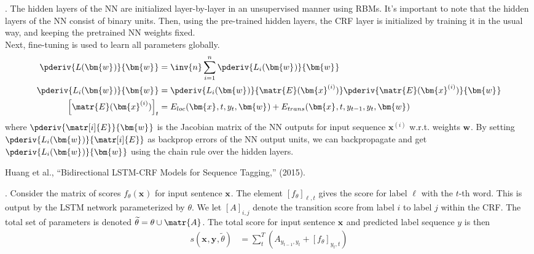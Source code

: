 \documentclass[11pt]{article}
\renewcommand\vec[2][]{\bm{#2}_{#1}}
\newcommand\myspace[1][]{\vspace{#1\bigskipamount}}
\newcommand\p{\Needspace{10\baselineskip} \noindent}
\begin{document}
\myspace
\p {}. The hidden layers of the NN are initialized layer-by-layer in an unsupervised manner using RBMs. It's important to note that the hidden layers of the NN consist of binary units. Then, using the pre-trained hidden layers, the CRF layer is initialized by training it in the usual way, and keeping the pretrained NN weights fixed. \\

Next, fine-tuning is used to learn all parameters globally.
\begin{align}
	\pderiv{L(\vec w)}{\vec w} 
		&= \inv{n}\sum_{i=1}^n \pderiv{L_i(\vec w)}{\vec w} \\
	\pderiv{L_i(\vec w)}{\vec w} 
		&= \pderiv{L_i(\vec w)}{\matr{E}(\vec{x}^{(i)})} \pderiv{\matr{E}(\vec{x}^{(i)})}{\vec w} \\
	\left[ \matr{E}(\vec{x}^{(i)}) \right]_t	
		&= E_{loc}(\vec x, t, y_t, \vec w) + E_{trans}(\vec x, t, y_{t-1}, y_t, \vec w) \\
\end{align}
where $\pderiv{\matr[i]{E}}{\vec w}$ is the Jacobian matrix of the NN outputs for input sequence $\vec{x}^{(i)}$ w.r.t. weights $\vec w$. By setting $\pderiv{L_i(\vec w)}{\matr[i]{E}}$ as backprop errors of the NN output units, we can backpropagate and get $\pderiv{L_i(\vec w)}{\vec w}$ using the chain rule over the hidden layers.






\vspace{-1em}
{\footnotesize Huang et al., ``Bidirectional LSTM-CRF Models for Sequence Tagging,'' (2015).}

\p {}. Consider the matrix of scores $f_{\theta}(\vec x)$ for input sentence $\vec x$. The element $\left[ f_{\theta} \right]_{\ell, t}$ gives the score for label $\ell$ with the $t$-th word. This is output by the LSTM network parameterized by $\theta$. We let $[A]_{i,j}$ denote the transition score from label $i$ to label $j$ within the CRF. The total set of parameters is denoted $\widetilde{\theta} = \theta \cup \matr{A}$. The total score for input sentence $\vec x$ and predicted label sequence $y$ is then 
\begin{align}
	s(\vec x, \vec y, \widetilde{\theta}) &= \sum_t^T \left(   A_{y_{t-1}, y_t} + \left[ f_{\theta}  \right]_{y_t, t}  \right)
\end{align}
\end{document}
